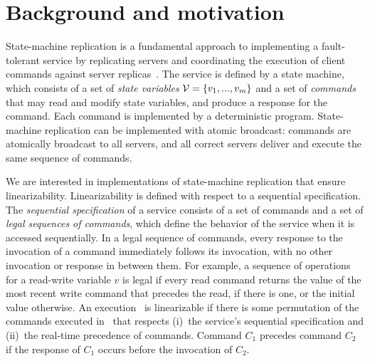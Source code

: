 
\section{Background and motivation}
\label{sec:smr}

State-machine replication is a fundamental approach to implementing a fault-tolerant service by replicating servers and coordinating the execution of client commands against server replicas~\cite{Lam78, Sch90}. 
The service is defined by a state machine, which consists of a set of \emph{state variables} $\mathcal{V} = \{v_1, ..., v_m\}$ 
and a set of \emph{commands} that may read and modify state variables, and produce a response for the command.
Each command is implemented by a deterministic program.
State-machine replication can be implemented with atomic broadcast: commands are atomically broadcast to all servers, and all correct servers deliver and execute the same sequence of commands.

We are interested in implementations of state-machine replication that ensure linearizability.
%
Linearizability is defined with respect to a sequential specification.
The \emph{sequential specification} of a service consists of a set of commands and a set of \emph{legal sequences of commands}, which define the behavior of the service when it is accessed sequentially.
In a legal sequence of commands, every response to the invocation of a command immediately follows its invocation, with no other invocation or response in between them.
For example, a sequence of operations for a read-write variable $v$ is legal if every read command returns the value of the most recent write command that precedes the read, if there is one, or the initial value otherwise.
An execution \ex\ is linearizable if there is some permutation of the commands executed in \ex\ that respects (i)~the service's sequential specification and (ii)~the real-time precedence of commands.
Command $C_1$ precedes command $C_2$ if the response of $C_1$ occurs before the invocation of $C_2$.


